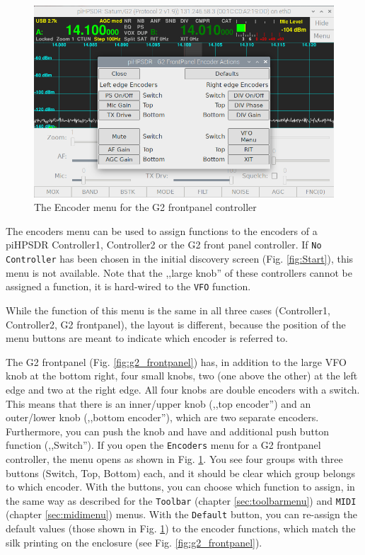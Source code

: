 \documentclass[12pt]{book}
\def\rett#1{\texttt{\color{red}#1}}
\def\bltt#1{\texttt{\color{blue}#1}}
\begin{document}
\begin{figure}[ht]
\center
\includegraphics[width=12cm]{EncoderMenuG2.png}
\caption{The Encoder menu for the G2 frontpanel controller}
\label{fig:EncoderMenuG2}
\end{figure}
The encoders menu can be used to assign functions to the encoders of a
piHPSDR Controller1, Controller2 or the G2 front panel controller.
If \texttt{No Controller} has been chosen in the initial discovery screen
(Fig. \ref{fig:Start}), this menu is not available.
Note that the ,,large knob'' of these controllers
cannot be assigned a function, it is hard-wired to the \bltt{VFO} function.



While the function of this menu is the same in all three cases (Controller1, Controller2,
G2 frontpanel), the layout is different, because the position of the menu buttons
are meant to indicate which encoder is referred to.



The G2 frontpanel (Fig. \ref{fig:g2_frontpanel}) has,
in addition to the large VFO knob at the bottom right,
four small knobs, two (one above the other)
at the left edge and two at the right edge. All four knobs are double encoders with
a switch. This means that there is an inner/upper knob (,,top encoder'') 
and an outer/lower knob (,,bottom encoder''), which
are two separate encoders. Furthermore, you can push the knob and have and additional
push button function (,,Switch''). If you open the \bltt{Encoders} menu for
a G2 frontpanel controller, the menu opens as shown in Fig. \ref{fig:EncoderMenuG2}.
You see four groups with three buttons (Switch, Top, Bottom) each, and it should be
clear which group belongs to which encoder. With the buttons, you can choose which function
to assign, in the same way as described for the \bltt{Toolbar} (chapter \ref{sec:toolbarmenu})
and \bltt{MIDI} (chapter \ref{sec:midimenu}) menus. With the \rett{Default} button, you can
re-assign the default values (those shown in Fig. \ref{fig:EncoderMenuG2})
to the encoder functions, which match the silk printing 
on the enclosure (see Fig. \ref{fig:g2_frontpanel}).
\end{document}
